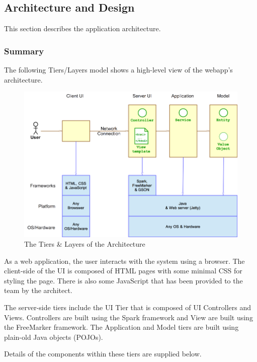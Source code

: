 \hypertarget{architecture-and-design}{%
\subsection{Architecture and Design}\label{architecture-and-design}}

This section describes the application architecture.

\hypertarget{summary}{%
\subsubsection{Summary}\label{summary}}

The following Tiers/Layers model shows a high-level view of the webapp's
architecture.

\begin{figure}[H]
\centering
\includegraphics{architecture-tiers-and-layers.png}
\caption{The Tiers \& Layers of the Architecture}
\end{figure}

As a web application, the user interacts with the system using a
browser. The client-side of the UI is composed of HTML pages with some
minimal CSS for styling the page. There is also some JavaScript that has
been provided to the team by the architect.

The server-side tiers include the UI Tier that is composed of UI
Controllers and Views. Controllers are built using the Spark framework
and View are built using the FreeMarker framework. The Application and
Model tiers are built using plain-old Java objects (POJOs).

Details of the components within these tiers are supplied below.

